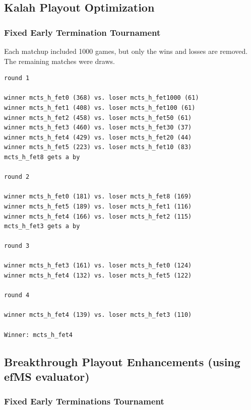 \documentclass{article}
\begin{document}
\subsection{Kalah Playout Optimization}


\subsubsection{Fixed Early Termination Tournament}

Each matchup included 1000 games, but only the wins and losses are removed. The remaining
matches were draws. 

\begin{verbatim}
round 1

winner mcts_h_fet0 (368) vs. loser mcts_h_fet1000 (61)
winner mcts_h_fet1 (408) vs. loser mcts_h_fet100 (61)
winner mcts_h_fet2 (458) vs. loser mcts_h_fet50 (61)
winner mcts_h_fet3 (460) vs. loser mcts_h_fet30 (37)
winner mcts_h_fet4 (429) vs. loser mcts_h_fet20 (44)
winner mcts_h_fet5 (223) vs. loser mcts_h_fet10 (83)
mcts_h_fet8 gets a by

round 2

winner mcts_h_fet0 (181) vs. loser mcts_h_fet8 (169)
winner mcts_h_fet5 (189) vs. loser mcts_h_fet1 (116)
winner mcts_h_fet4 (166) vs. loser mcts_h_fet2 (115)
mcts_h_fet3 gets a by

round 3

winner mcts_h_fet3 (161) vs. loser mcts_h_fet0 (124)
winner mcts_h_fet4 (132) vs. loser mcts_h_fet5 (122)

round 4

winner mcts_h_fet4 (139) vs. loser mcts_h_fet3 (110)

Winner: mcts_h_fet4
\end{verbatim}


\subsection{Breakthrough Playout Enhancements (using efMS evaluator)}


\subsubsection{Fixed Early Terminations Tournament}
\end{document}
